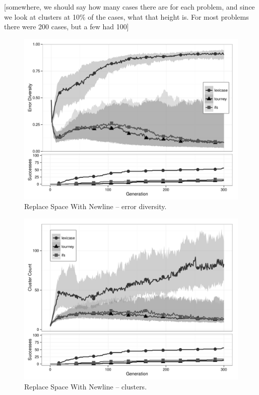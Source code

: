 [somewhere, we should say how many cases there are for each problem, and since we look at clusters at 10\% of the cases, what that height is. For most problems there were 200 cases, but a few had 100]


\begin{figure}%
\centering
\includegraphics[width=11.5cm]{replace-space-with-newline-diversity.pdf}
\caption{Replace Space With Newline -- error diversity.}
\label{rswnDiv}
\end{figure}

\begin{figure}%
\centering
\includegraphics[width=11.5cm]{replace-space-with-newline-cluster.pdf}
\caption{Replace Space With Newline -- clusters.}
\label{rswnClu}
\end{figure}

